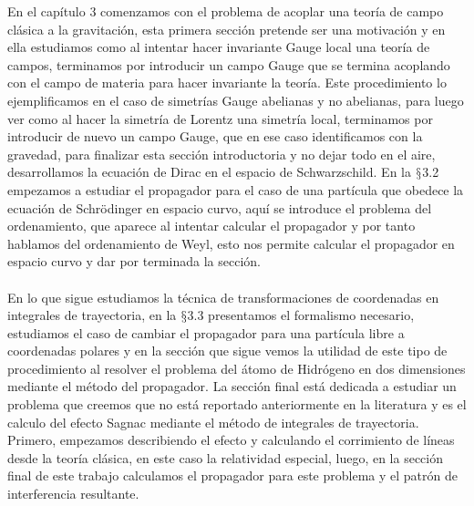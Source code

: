 En el capítulo 3 comenzamos con el problema de acoplar una teoría de campo clásica a la gravitación, esta primera sección pretende ser una motivación y en ella estudiamos como al intentar hacer invariante Gauge local una teoría de campos, terminamos por introducir un campo Gauge que se termina acoplando con el campo de materia para hacer invariante la teoría. Este procedimiento lo ejemplificamos en el caso de simetrías Gauge abelianas y no abelianas, para luego ver como al hacer la simetría de Lorentz una simetría local, terminamos por introducir de nuevo un campo Gauge, que en ese caso identificamos con la gravedad, para finalizar esta sección introductoria y no dejar todo en el aire, desarrollamos la ecuación de Dirac en el espacio de Schwarzschild. En la  $\mathsection$3.2 empezamos a estudiar el propagador para el caso de una partícula que obedece la ecuación de Schrödinger en espacio curvo, aquí se introduce el problema del ordenamiento, que aparece al intentar calcular el propagador y por tanto hablamos del ordenamiento de Weyl, esto nos permite calcular el propagador en espacio curvo y dar por terminada la sección.
\\
\\
En lo que sigue estudiamos la técnica de transformaciones de coordenadas en integrales de trayectoria, en la  $\mathsection$3.3 presentamos el formalismo necesario, estudiamos el caso de cambiar el propagador para una partícula libre a coordenadas polares y en la sección que sigue vemos la utilidad de este tipo de procedimiento al resolver el problema del átomo de Hidrógeno en dos dimensiones mediante el método del propagador. La sección final está dedicada a estudiar un problema que creemos que no está reportado anteriormente en la literatura y es el calculo del efecto Sagnac mediante el método de integrales de trayectoria. Primero, empezamos describiendo el efecto y calculando el corrimiento de líneas desde la teoría clásica, en este caso la relatividad especial, luego, en la sección final de este trabajo calculamos el propagador para este problema y el patrón de interferencia resultante.
\\
\\
